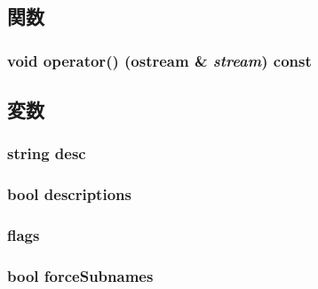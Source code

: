\subsection{関数}
\hypertarget{structStats_1_1VectorPrint_ab796867ec17c9aaf14b8e44923fc17e4}{
\subsubsection[{operator()}]{\setlength{\rightskip}{0pt plus 5cm}void operator() (ostream \& {\em stream}) const}}
\label{structStats_1_1VectorPrint_ab796867ec17c9aaf14b8e44923fc17e4}


\subsection{変数}
\hypertarget{structStats_1_1VectorPrint_acc6fde76f2c440ef4a9f7dc3765038b5}{
\subsubsection[{desc}]{\setlength{\rightskip}{0pt plus 5cm}string {\bf desc}}}
\label{structStats_1_1VectorPrint_acc6fde76f2c440ef4a9f7dc3765038b5}
\hypertarget{structStats_1_1VectorPrint_ada0eec8923acca0939a06f40c6a88af8}{
\subsubsection[{descriptions}]{\setlength{\rightskip}{0pt plus 5cm}bool {\bf descriptions}}}
\label{structStats_1_1VectorPrint_ada0eec8923acca0939a06f40c6a88af8}
\hypertarget{structStats_1_1VectorPrint_aa991e2b209ef26272bf4fd920777bcda}{
\subsubsection[{flags}]{ {\bf flags}}}
\label{structStats_1_1VectorPrint_aa991e2b209ef26272bf4fd920777bcda}
\hypertarget{structStats_1_1VectorPrint_a8545c859ef3a99dbc94c6ff9945e8024}{
\subsubsection[{forceSubnames}]{\setlength{\rightskip}{0pt plus 5cm}bool {\bf forceSubnames}}}

